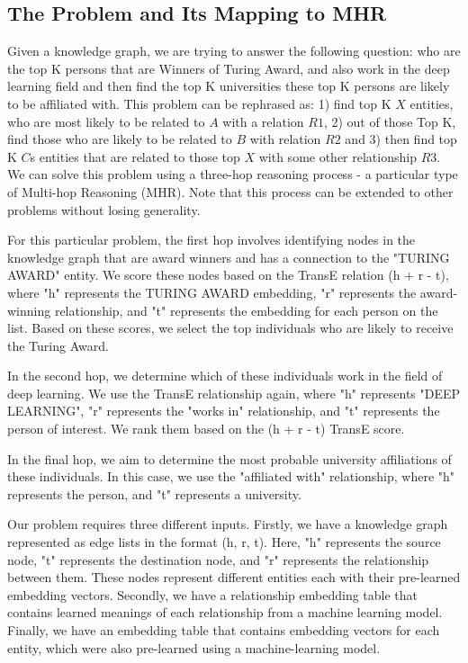 \documentclass[sigconf]{acmart}
\begin{document}
\subsection{The Problem and Its Mapping to MHR}
Given a knowledge graph, we are trying to answer the following question: who are the top K persons that are Winners of Turing Award, and also work in the deep learning field and then find the top K universities these top K persons are likely to be affiliated with. This problem can be rephrased as: 1) find top K $X$ entities, who are most likely to be related to $A$ with a relation $R1$, 2) out of those Top K, find those who are likely to be related to $B$ with relation $R2$ and 3) then find top K $C$s entities that are related to those top $X$ with some other relationship $R3$. We can solve this problem using a three-hop reasoning process - a particular type of Multi-hop Reasoning (MHR). Note that this process can be extended to other problems without losing generality.

For this particular problem, the first hop involves identifying nodes in the knowledge graph that are award winners and has a connection to the "TURING AWARD" entity. We score these nodes based on the TransE relation (h + r - t), where "h" represents the TURING AWARD embedding, "r" represents the award-winning relationship, and "t" represents the embedding for each person on the list. Based on these scores, we select the top individuals who are likely to receive the Turing Award.

In the second hop, we determine which of these individuals work in the field of deep learning. We use the TransE relationship again, where "h" represents "DEEP LEARNING", "r" represents the "works in" relationship, and "t" represents the person of interest. We rank them based on the (h + r - t) TransE score.

In the final hop, we aim to determine the most probable university affiliations of these individuals. In this case, we use the "affiliated with" relationship, where "h" represents the person, and "t" represents a university. 


Our problem requires three different inputs. Firstly, we have a knowledge graph represented as edge lists in the format (h, r, t). Here, "h" represents the source node, "t" represents the destination node, and "r" represents the relationship between them. These nodes represent different entities each with their pre-learned embedding vectors. Secondly, we have a relationship embedding table that contains learned meanings of each relationship from a machine learning model. Finally, we have an embedding table that contains embedding vectors for each entity, which were also pre-learned using a machine-learning model.
\end{document}
